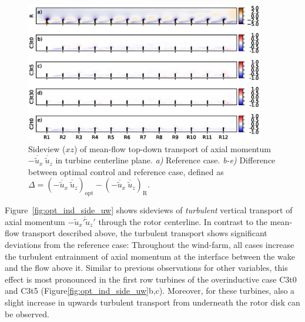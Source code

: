 	\begin{figure}[t]
		\centering
		\includegraphics[width=0.93\textwidth]{chapters/optimal_induction_control/sideview_uwm.eps}
		\caption[Sideview ($xz$) of mean-flow top-down transport of axial momentum $- \overline{\widetilde{u}}_x~ \overline{\widetilde{u}}_z$ in turbine centerline plane.]{Sideview ($xz$) of mean-flow top-down transport of axial momentum $- \overline{\widetilde{u}}_x~ \overline{\widetilde{u}}_z$ in turbine centerline plane. \emph{a) } Reference case. \emph{b-e)} Difference between optimal control and reference case, defined as $\Delta = (- \overline{\widetilde{u}}_x~ \overline{\widetilde{u}}_z)_{\text{opt}} - (- \overline{\widetilde{u}}_x~ \overline{\widetilde{u}}_z)_{\text{R}}$. \label{fig:opt_ind_side_uwm}}
	\end{figure}

	Figure~\ref{fig:opt_ind_side_uw} shows sideviews of \emph{turbulent} vertical transport of axial momentum $- \overline{\widetilde{u}_x'\widetilde{u}_z'}$ through the rotor centerline. In contrast to the mean-flow transport described above, the turbulent transport shows significant deviations from the reference case: Throughout the wind-farm, all cases increase the turbulent entrainment of axial momentum at the interface between the wake and the flow above it. Similar to previous observations for other variables, this effect is most pronounced in the first row turbines of the overinductive case C3t0 and C3t5 (Figure\ref{fig:opt_ind_side_uw}b,c). Moreover, for these turbines, also a slight increase in upwards turbulent transport from underneath the rotor disk can be observed.


